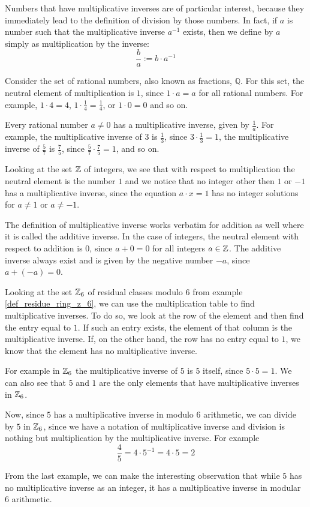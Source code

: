Numbers that have multiplicative inverses are of particular interest, because they immediately lead to the definition of division by those numbers. In fact, if $a$ is number such that the multiplicative inverse $a^{-1}$ exists, then we define  by $a$ simply as multiplication by the inverse:
\begin{equation}
\frac{b}{a}:= b\cdot a^{-1}
\end{equation}
\begin{example} Consider the set of rational numbers, also known as fractions, $\mathbb{Q}$. For this set, the neutral element of multiplication is $1$, since $1\cdot a = a$ for all rational numbers. For example, $1\cdot 4=4$, $1\cdot \frac{1}{4}=\frac{1}{4}$, or $1\cdot 0 =0$ and so on.

Every rational number $a\neq 0$ has a multiplicative inverse, given by $\frac{1}{a}$.
For example, the multiplicative inverse of $3$ is $\frac{1}{3}$, since $3\cdot \frac{1}{3}=1$, the multiplicative inverse of $\frac{5}{7}$ is $\frac{7}{5}$, since $\frac{5}{7}\cdot \frac{7}{5}=1$, and so on.
\end{example}
\begin{example}Looking at  the set $\mathbb{Z}$ of integers, we see that with respect to multiplication the neutral element is the number $1$ and we notice that no integer other then $1$ or $-1$ has a multiplicative inverse, since the equation $a\cdot x =1$ has no integer solutions for $a\neq 1$ or $a\neq -1$.

The definition of multiplicative inverse works verbatim for addition as well where it is called the additive inverse. In the case of integers, the neutral element with respect to addition is $0$, since $a+0=0$ for all integers $a\in\mathbb{Z}$. The additive inverse always exist and is given by the negative number $-a$, since $a+(-a)=0$.
\end{example}
\begin{example} Looking at the set $\mathbb{Z}_6$ of residual classes modulo $6$ from example \ref{def_residue_ring_z_6}, we can use the multiplication table to find multiplicative inverses. To do so, we look at the row of the element and then find the entry equal to $1$. If such an entry exists, the element of that column is the multiplicative inverse. If, on the other hand, the row has no entry equal to $1$, we know that the element has no multiplicative inverse.

For example in $\mathbb{Z}_6$ the multiplicative inverse of $5$ is $5$ itself, since $5\cdot 5=1$. We can also see that $5$ and $1$ are the only elements that have multiplicative inverses in $\mathbb{Z}_6$.

Now, since $5$ has a multiplicative inverse in modulo $6$ arithmetic, we can divide by $5$ in $\mathbb{Z}_6$, since we have a notation of multiplicative inverse and division is nothing but multiplication by the multiplicative inverse. For example
$$
\frac{4}{5}= 4\cdot 5^{-1} = 4\cdot 5 = 2
$$
\end{example}
From the last example, we can make the interesting observation that while $5$ has no multiplicative inverse as an integer, it has a multiplicative inverse in modular $6$ arithmetic.

